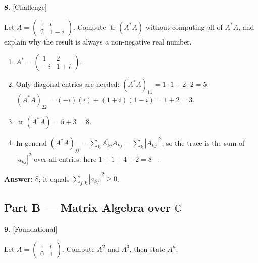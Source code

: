 \documentclass[11pt]{article}
\begin{document}
\par\vspace{2pt}
\begin{minipage}{\linewidth}\textbf{8.} \hfill{\scriptsize\color{ink}[Challenge]}\par\nopagebreak Let $A=\begin{pmatrix}1&i\\2&1-i\end{pmatrix}$. Compute $\operatorname{tr}(A^{*}A)$ without computing all of $A^{*}A$, and explain why the result is always a non-negative real number.
\end{minipage}\par\nopagebreak
\begin{tcolorbox}[breakable,colback=ans,colframe=ansb,boxrule=0.5pt,left=4pt,right=4pt,top=2pt,bottom=2pt]\begin{enumerate}[leftmargin=2.2em,itemsep=1pt,topsep=1pt,label=\textbf{Step \arabic*.}]\item $A^{*}=\begin{pmatrix}1&2\\-i&1+i\end{pmatrix}$.
\item Only diagonal entries are needed: $(A^{*}A)_{11}=1\cdot1+2\cdot2=5$; $(A^{*}A)_{22}=(-i)(i)+(1+i)(1-i)=1+2=3$.
\item $\operatorname{tr}(A^{*}A)=5+3=8$.
\item In general $(A^{*}A)_{jj}=\sum_k\overline{A_{kj}}A_{kj}=\sum_k|A_{kj}|^{2}$, so the trace is the sum of $|a_{kj}|^{2}$ over all entries: here $1+1+4+2=8$ \ \checkmark.
\end{enumerate}\textbf{Answer:} $8$; it equals $\sum_{j,k}|a_{kj}|^{2}\ge0$.\end{tcolorbox}
\par\vspace{2pt}
\subsection*{\normalsize\color{ink} Part B --- Matrix Algebra over $\mathbb{C}$}
\begin{minipage}{\linewidth}\textbf{9.} \hfill{\scriptsize\color{ink}[Foundational]}\par\nopagebreak Let $A=\begin{pmatrix}1&i\\0&1\end{pmatrix}$. Compute $A^{2}$ and $A^{3}$, then state $A^{n}$.
\end{minipage}\par\nopagebreak
\end{document}
